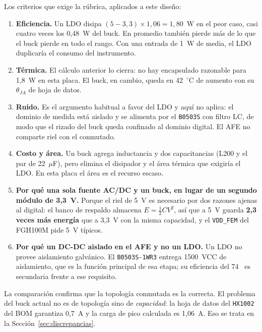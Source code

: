 \documentclass[11pt,a4paper]{article}
\newcommand{\pct}{\text{\char37}}
\begin{document}
\noindent Los criterios que exige la rúbrica, aplicados a este diseño:

\begin{enumerate}
  \item \textbf{Eficiencia.} Un LDO disipa $(5-3{,}3)\times1{,}06 = 1{,}80$~W
        en el peor caso, casi cuatro veces los 0,48~W del buck. En promedio
        también pierde más de lo que el buck pierde en todo el rango. Con una
        entrada de 1~W de media, el LDO duplicaría el consumo del instrumento.
  \item \textbf{Térmica.} El cálculo anterior lo cierra: no hay encapsulado
        razonable para 1,8~W en esta placa. El buck, en cambio, queda en
        42~$^\circ$C de aumento con su $\theta_{JA}$ de hoja de datos.
  \item \textbf{Ruido.} Es el argumento habitual a favor del LDO y aquí no
        aplica: el dominio de medida está aislado y se alimenta por el
        \texttt{B0503S} con filtro LC, de modo que el rizado del buck queda
        confinado al dominio digital. El AFE no comparte riel con el conmutado.
  \item \textbf{Costo y área.} Un buck agrega inductancia y dos capacitancias
        (L200 y el par de 22~$\mu$F), pero elimina el disipador y el área térmica
        que exigiría el LDO. En esta placa el área es el recurso escaso.
  \item \textbf{Por qué una sola fuente AC/DC y un buck, en lugar de un segundo
        módulo de 3,3~V.} Porque el riel de 5~V es necesario por dos razones
        ajenas al digital: el banco de respaldo almacena $E=\tfrac12CV^2$, así
        que a 5~V guarda \textbf{2,3 veces más energía} que a 3,3~V con la misma
        capacidad, y el \texttt{VDD\_FEM} del FGH100M pide 5~V típicos.
  \item \textbf{Por qué un DC-DC aislado en el AFE y no un LDO.} Un LDO no
        provee aislamiento galvánico. El \texttt{B0503S-1WR3} entrega 1500~VCC
        de aislamiento, que es la función principal de esa etapa; su eficiencia
        del 74~\pct{} es secundaria frente a ese requisito.
\end{enumerate}

\noindent La comparación confirma que la topología conmutada es la correcta. El
problema del buck actual no es de topología sino de \emph{capacidad}: la hoja de
datos del \texttt{HX1002} del BOM garantiza 0,7~A y la carga de pico calculada
es 1,06~A. Eso se trata en la Sección~\ref{sec:discrepancias}.
\end{document}

